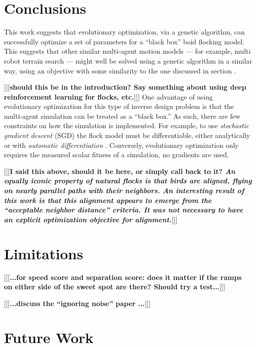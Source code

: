 \documentclass[letterpaper]{article}
\begin{document}
\section{Conclusions}
\label{sec:Conclusions}

This work suggests that evolutionary optimization, via a genetic algorithm, can successfully optimize a set of parameters for a ``black box'' boid flocking model. This suggests that other similar multi-agent motion models --- for example, multi robot terrain search --- might well be solved using a genetic algorithm in a similar way, using an objective with some similarity to the one discussed in section .

[[[\textbf{should this be in the introduction? Say something about using deep reinforcement learning for flocks, etc.}]]] One advantage of using evolutionary optimization for this type of inverse design problem is that the multi-agent simulation can be treated as a ``black box.'' As such, there are few constraints on how the simulation is implemented. For example, to use \textit{stochastic gradient descent} (SGD) \citep{robbins_stochastic_1951} the flock model must be differentiable, either analytically or with \textit{automatic differentiation} \citep{baydin_automatic_2018}. Conversely, evolutionary optimization only requires the measured scalar fitness of a simulation, no gradients are used.

[[[\textbf{I said this above, should it be here, or simply call back to it? \textit{An equally iconic property of natural flocks is that birds are aligned, flying on nearly parallel paths with their neighbors. An interesting result of this work is that this alignment appears to \textit{emerge} from the ``acceptable neighbor distance'' criteria. It was \textbf{not} necessary to have an explicit optimization objective for alignment.}}]]]

\section{Limitations}
\label{sec:limitations}

[[[\textbf{...for speed score and separation score: does it matter if the ramps on either side of the sweet spot are there? Should try a test...}]]]

[[[\textbf{...discuss the ``ignoring noise'' paper \citep{antipov_evolutionary_2025}...}]]]

\section{Future Work}
\label{sec:future}
\end{document}

